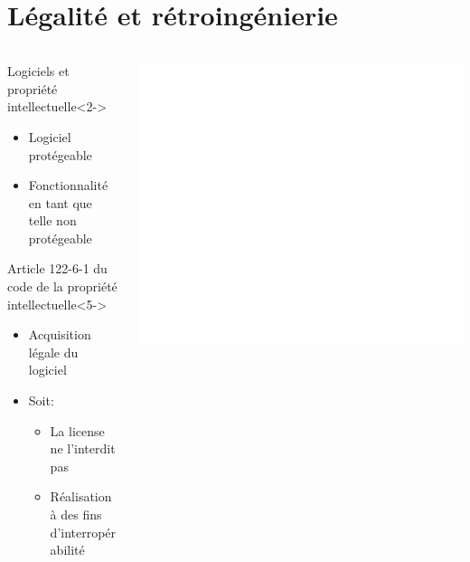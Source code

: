 \documentclass[aspectratio=1610]{beamer}%
\begin{document}
  \section{Légalité et rétroingénierie}
  \begin{frame}[t]
    \slidetitle[]%
    \begin{columns}
      \begin{column}{0.7\linewidth}
        \begin{block}{Logiciels et propriété intellectuelle}<2->
          \begin{itemize}
          \item<3-> Logiciel protégeable
          \item<4-> Fonctionnalité en tant que telle non protégeable
          \end{itemize}
        \end{block}
        \begin{block}{Article 122-6-1 du code de la propriété intellectuelle}<5->
          \begin{itemize}
          \item<6-> Acquisition légale du logiciel
          \item<7-> Soit:
          \begin{itemize}
          \item<8-> La license ne l'interdit pas
          \item<9-> Réalisation à des fins d'interropérabilité
          \end{itemize} 
          \end{itemize}
        \end{block}
      \end{column}
      \begin{column}{0.25\linewidth}
        \includegraphics[width=0.95\linewidth]{justice.png}

\end{column}
\end{columns}
\end{frame}
\end{document}
